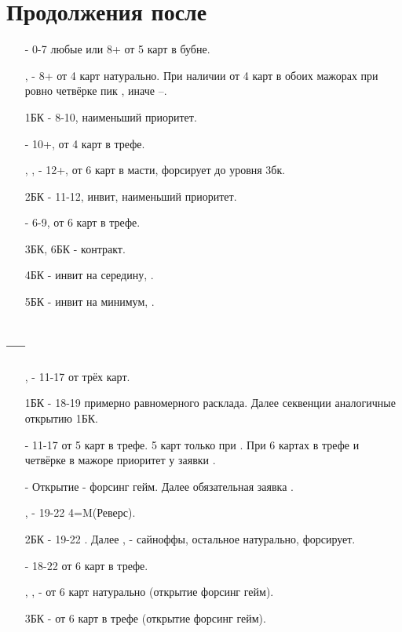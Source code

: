 \documentclass{article}
\begin{document}
\section{Продолжения после }
\begin{enumerate}
    \item[\di{1}] - 0-7 любые или 8+ от 5 карт в бубне.
    \item[\he{1}, \sp{1}] - 8+ от 4 карт натурально. При наличии от 4 карт в обоих мажорах при ровно четвёрке пик , иначе --.
    \item[1БК] - 8-10, наименьший приоритет.
    \item[\cl{2}] - 10+, от 4 карт в трефе.
    \item[\di{2}, \he{2}, \sp{2}] - 12+, от 6 карт в масти, форсирует до уровня 3бк.
    \item[2БК] - 11-12, инвит, наименьший приоритет.
    \item[\cl{3}] - 6-9, от 6 карт в трефе. 
    \item[3БК, 6БК] - контракт.
    \item[4БК] - инвит на середину, .
    \item[5БК] - инвит на минимум,
    .
\end{enumerate}
\subsection{ --- }
\begin{enumerate}
    \item[\he{1}, \sp{1}] - 11-17 от трёх карт.
    \item[1БК] - 18-19 примерно равномерного расклада. Далее секвенции аналогичные открытию 1БК.
    \item[\cl{2}] - 11-17 от 5 карт в трефе. 5 карт только при . При 6 картах в трефе и четвёрке в мажоре приоритет у заявки .
    \item[\di{2}] - Открытие - форсинг гейм. Далее обязательная заявка .
    \item[\he{2}, \sp{2}] - 19-22 4=M(Реверс). 
    \item[2БК] - 19-22 . Далее , - сайноффы, остальное натурально, форсирует.
    \item[\cl{3}] - 18-22 от 6 карт в трефе.
    \item[\di{3}, \he{3}, \sp{3}] - от 6 карт натурально (открытие форсинг гейм).
    \item[3БК] - от 6 карт в трефе (открытие форсинг гейм).
\end{enumerate}
\end{document}
